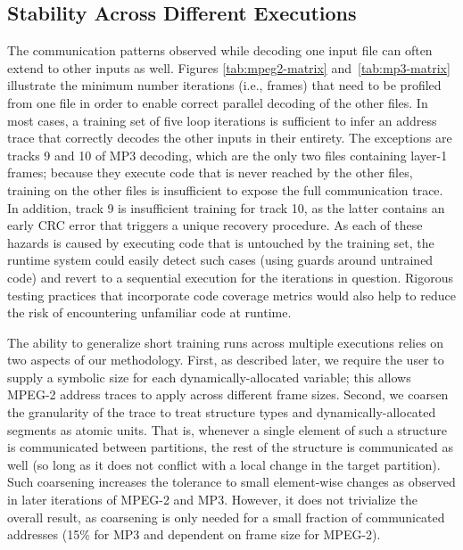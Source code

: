 
\subsection*{Stability Across Different Executions}

The communication patterns observed while decoding one input file can
often extend to other inputs as well.  Figures \ref{tab:mpeg2-matrix}
and~\ref{tab:mp3-matrix} illustrate the minimum number iterations
(i.e., frames) that need to be profiled from one file in order to
enable correct parallel decoding of the other files.  In most cases, a
training set of five loop iterations is sufficient to infer an address
trace that correctly decodes the other inputs in their entirety.  The
exceptions are tracks 9 and 10 of MP3 decoding, which are the only two
files containing layer-1 frames; because they execute code that is
never reached by the other files, training on the other files is
insufficient to expose the full communication trace.  In addition,
track 9 is insufficient training for track 10, as the latter contains
an early CRC error that triggers a unique recovery procedure.  As each
of these hazards is caused by executing code that is untouched by the
training set, the runtime system could easily detect such cases (using
guards around untrained code) and revert to a sequential execution for
the iterations in question.  Rigorous testing practices that
incorporate code coverage metrics would also help to reduce the risk
of encountering unfamiliar code at runtime.

The ability to generalize short training runs across multiple
executions relies on two aspects of our methodology.  First, as
described later, we require the user to supply a symbolic size for
each dynamically-allocated variable; this allows MPEG-2 address traces
to apply across different frame sizes.  Second, we coarsen the
granularity of the trace to treat structure types and
dynamically-allocated segments as atomic units.  That is, whenever a
single element of such a structure is communicated between partitions,
the rest of the structure is communicated as well (so long as it does
not conflict with a local change in the target partition).  Such
coarsening increases the tolerance to small element-wise changes as
observed in later iterations of MPEG-2 and MP3.  However, it does not
trivialize the overall result, as coarsening is only needed for a
small fraction of communicated addresses (15\% for MP3 and dependent
on frame size for MPEG-2).

